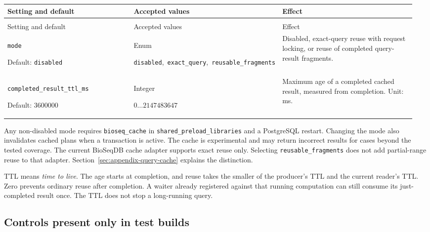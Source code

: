 \begingroup
\small
\setlength{\tabcolsep}{4pt}
\renewcommand{\arraystretch}{1.16}
\begin{longtable}{@{}>{\raggedright\arraybackslash}p{0.34\linewidth}>{\raggedright\arraybackslash}p{0.22\linewidth}>{\raggedright\arraybackslash}p{0.40\linewidth}@{}}
\toprule
Setting and default & Accepted values & Effect \\
\midrule
\endfirsthead
\multicolumn{3}{@{}l}{Prefix: \nolinkurl{bioseq_cache.query_cache} (continued)} \\
\toprule
Setting and default & Accepted values & Effect \\
\midrule
\endhead
\bottomrule
\endfoot
\nolinkurl{mode}\par Default: \nolinkurl{disabled} & Enum\par \nolinkurl{disabled},\allowbreak\ \nolinkurl{exact_query},\allowbreak\ \nolinkurl{reusable_fragments} & Disabled, exact-query reuse with request locking, or reuse of completed query-result fragments. \\[4pt]
\nolinkurl{completed_result_ttl_ms}\par Default: 3600000 & Integer\par $0\ldots 2147483647$ & Maximum age of a completed cached result, measured from completion. Unit: ms. \\[4pt]
\end{longtable}
\endgroup

Any non-disabled mode requires \texttt{bioseq\_cache} in
\texttt{shared\_preload\_libraries} and a PostgreSQL restart. Changing the mode
also invalidates cached plans when a transaction is active. The cache is
experimental and may return incorrect results for cases beyond the tested
coverage. The current BioSeqDB cache adapter supports exact reuse only.
Selecting \texttt{reusable\_fragments} does not add partial-range reuse to that
adapter. Section~\ref{sec:appendix-query-cache} explains the distinction.

TTL means \emph{time to live}. The age starts at completion, and reuse takes the
smaller of the producer's TTL and the current reader's TTL. Zero prevents
ordinary reuse after completion. A waiter already registered against that
running computation can still consume its just-completed result once. The
TTL does not stop a long-running query.

\subsection{Controls present only in test builds}

